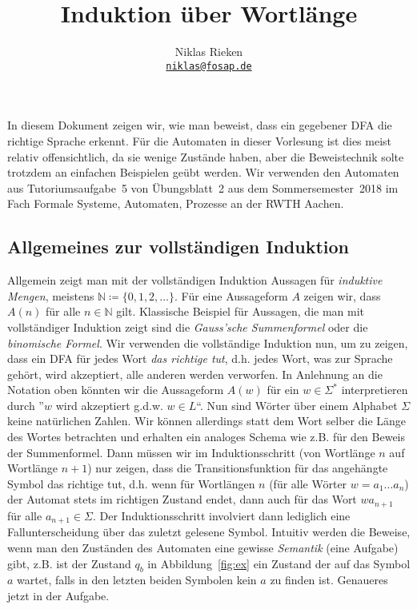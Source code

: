 \documentclass[11pt, a4paper]{article}
\author{Niklas Rieken\\ \href{mailto:niklas@fosap.de}{\texttt{niklas@fosap.de}}}
\title{Induktion über Wortlänge}
\begin{document}
\maketitle

In diesem Dokument zeigen wir, wie man beweist, dass ein gegebener DFA die richtige Sprache erkennt. Für die Automaten in dieser Vorlesung ist dies meist relativ offensichtlich, da sie wenige Zustände haben, aber die Beweistechnik solte trotzdem an einfachen Beispielen geübt werden. Wir verwenden den Automaten aus Tutoriumsaufgabe~5 von Übungsblatt~2 aus dem Sommersemester~2018 im Fach Formale Systeme, Automaten, Prozesse an der RWTH Aachen.

\subsection*{Allgemeines zur vollständigen Induktion}
Allgemein zeigt man mit der vollständigen Induktion Aussagen für \textit{induktive Mengen}, meistens $\mathbb{N} \coloneqq \{0, 1, 2, \ldots\}$. Für eine Aussageform $A$ zeigen wir, dass $A(n)$ für alle $n \in \mathbb{N}$ gilt. Klassische Beispiel für Aussagen, die man mit vollständiger Induktion zeigt sind die \textit{Gauss'sche Summenformel} oder die \textit{binomische Formel}. Wir verwenden die vollständige Induktion nun, um zu zeigen, dass ein DFA für jedes Wort \textit{das richtige tut}, d.h. jedes Wort, was zur Sprache gehört, wird akzeptiert, alle anderen werden verworfen. In Anlehnung an die Notation oben könnten wir die Aussageform $A(w)$ für ein $w \in \Sigma^\ast$ interpretieren durch ''$w$ wird akzeptiert g.d.w. $w \in L$``. Nun sind Wörter über einem Alphabet $\Sigma$ keine natürlichen Zahlen. Wir können allerdings statt dem Wort selber die Länge des Wortes betrachten und erhalten ein analoges Schema wie z.B. für den Beweis der Summenformel. Dann müssen wir im Induktionsschritt (von Wortlänge $n$ auf Wortlänge $n+1$) nur zeigen, dass die Transitionsfunktion für das angehängte Symbol das richtige tut, d.h. wenn für Wortlängen $n$ (für alle Wörter $w = a_1 \ldots a_n$) der Automat stets im richtigen Zustand endet, dann auch für das Wort $w a_{n+1}$ für alle $a_{n+1} \in \Sigma$. Der Induktionsschritt involviert dann lediglich eine Fallunterscheidung über das zuletzt gelesene Symbol. Intuitiv werden die Beweise, wenn man den Zuständen des Automaten eine gewisse \textit{Semantik} (eine Aufgabe) gibt, z.B. ist der Zustand $q_b$ in Abbildung~\ref{fig:ex} ein Zustand der auf das Symbol $a$ wartet, falls in den letzten beiden Symbolen kein $a$ zu finden ist. Genaueres jetzt in der Aufgabe. 
\end{document}

